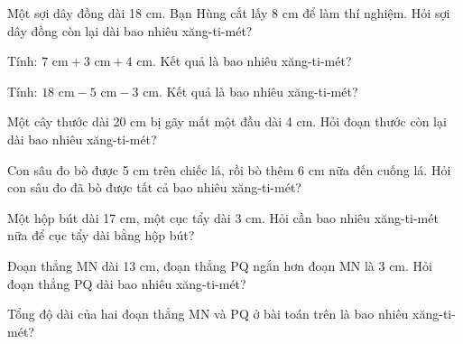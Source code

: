 \begin{ex}
Một sợi dây đồng dài 18 cm. Bạn Hùng cắt lấy 8 cm để làm thí nghiệm. Hỏi sợi dây đồng còn lại dài bao nhiêu xăng-ti-mét?
\end{ex}

\begin{ex}
Tính: $7\text{ cm} + 3\text{ cm} + 4\text{ cm}$. Kết quả là bao nhiêu xăng-ti-mét?
\end{ex}

\begin{ex}
Tính: $18\text{ cm} - 5\text{ cm} - 3\text{ cm}$. Kết quả là bao nhiêu xăng-ti-mét?
\end{ex}

\begin{ex}
Một cây thước dài 20 cm bị gãy mất một đầu dài 4 cm. Hỏi đoạn thước còn lại dài bao nhiêu xăng-ti-mét?
\end{ex}

\begin{ex}
Con sâu đo bò được 5 cm trên chiếc lá, rồi bò thêm 6 cm nữa đến cuống lá. Hỏi con sâu đo đã bò được tất cả bao nhiêu xăng-ti-mét?
\end{ex}

\begin{ex}
Một hộp bút dài 17 cm, một cục tẩy dài 3 cm. Hỏi cần bao nhiêu xăng-ti-mét nữa để cục tẩy dài bằng hộp bút?
\end{ex}

\begin{ex}
Đoạn thẳng MN dài 13 cm, đoạn thẳng PQ ngắn hơn đoạn MN là 3 cm. Hỏi đoạn thẳng PQ dài bao nhiêu xăng-ti-mét?
\end{ex}

\begin{ex}
Tổng độ dài của hai đoạn thẳng MN và PQ ở bài toán trên là bao nhiêu xăng-ti-mét?
\end{ex}

